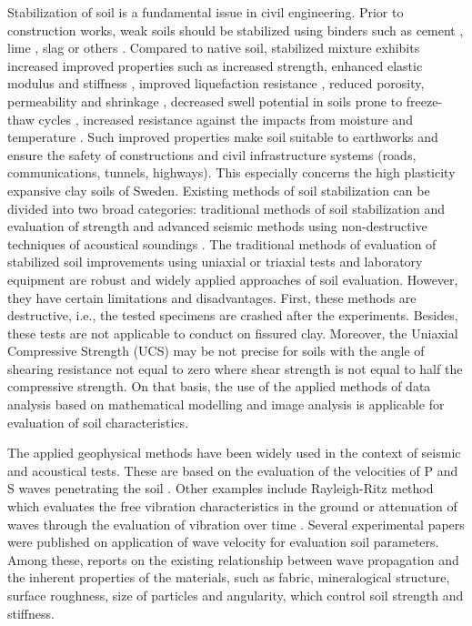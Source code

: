 \documentclass[final,3p,times,onecolumn,authoryear]{elsarticle}
\begin{document}
Stabilization of soil is a fundamental issue in civil engineering. Prior to construction works, weak soils should be stabilized using binders such as cement \citep{Bache,Chenetal2021,LindhLemenkova2022b}, lime \citep{Kichouetal,Chand}, slag \citep{LindhLemenkova2021a} or others \citep{Mirzababaei}. Compared to native soil, stabilized mixture exhibits increased improved properties such as increased strength, enhanced elastic modulus and stiffness \citep{Madhyannapuetal2010,SUNDARY2022103299}, improved liquefaction resistance \citep{ITO199433}, reduced porosity, permeability and shrinkage \cite{TONINIDEARAUJO2023129757,Nagih,Ahnberg2003}, decreased swell potential in soils prone to freeze-thaw cycles \citep{ShihataBaghdadi,BinShafique,Orakoglu}, increased resistance against the impacts from moisture and temperature \citep{Zhangetal2020,Kimetal2012}. Such improved properties make soil suitable to earthworks and ensure the safety of constructions and civil infrastructure systems (roads, communications, tunnels, highways). This especially concerns the high plasticity expansive clay soils of Sweden. Existing methods of soil stabilization can be divided into two broad categories: traditional methods of soil stabilization and evaluation of strength \citep{Trhl,LindhLemenkova2022a,Heidarizadeh} and advanced seismic methods using non-destructive techniques of acoustical soundings \citep{Varma,Foti,LindhLemenkova2021b,GarciaSuarez}. The traditional methods of evaluation of stabilized soil improvements using uniaxial \citep{Avci,Lapointe,XuYi} or triaxial \citep{ALVARADO} tests and laboratory equipment are robust and widely applied approaches of soil evaluation. However, they have certain limitations and disadvantages. First, these methods are destructive, i.e., the tested specimens are crashed after the experiments. Besides, these tests are not applicable to conduct on fissured clay. Moreover, the Uniaxial Compressive Strength (UCS) may be not precise for soils with the angle of shearing resistance not equal to zero where shear strength is not equal to half the compressive strength. On that basis, the use of the applied methods of data analysis based on mathematical modelling \citep{Jefferies} and image analysis \citep{Kallenetal2014,Kallenetal2016} is applicable for evaluation of soil characteristics.

The applied geophysical methods have been widely used in the context of seismic and acoustical tests. These are based on the evaluation of the velocities of P and S waves penetrating the soil \citep{Safaee,LindhLemenkova2022c,FotiLancellotta}. Other examples include Rayleigh-Ritz method which evaluates the free vibration characteristics in the ground \citep{SonkarMittal,Jones} or attenuation of waves through the evaluation of vibration over time \citep{Colombero}. Several experimental papers were published on application of wave velocity for evaluation soil parameters. Among these, \cite{Santamarina} reports on the existing relationship between wave propagation and the inherent properties of the materials, such as fabric, mineralogical structure, surface roughness, size of particles and angularity, which control soil strength and stiffness.
\end{document}
